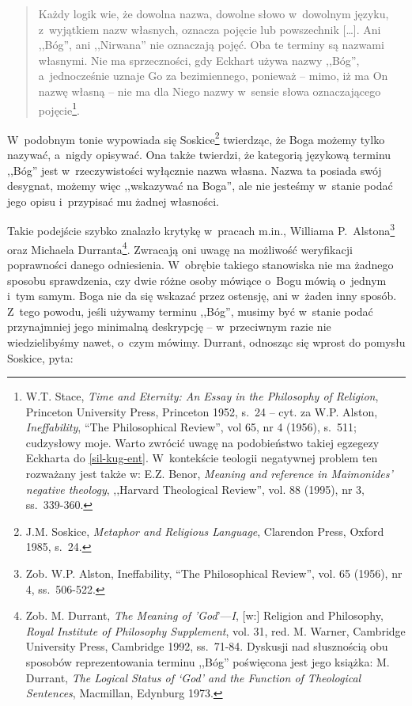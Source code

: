 \begin{quote}
Każdy logik wie, że dowolna nazwa, dowolne słowo w~dowolnym języku, z~wyjątkiem nazw własnych, oznacza pojęcie lub powszechnik [\ldots]. Ani ,,Bóg'', ani ,,Nirwana'' nie oznaczają pojęć. Oba te terminy są nazwami własnymi. Nie ma sprzeczności, gdy Eckhart używa nazwy ,,Bóg'', a~jednocześnie uznaje Go za bezimiennego, ponieważ -- mimo, iż ma On nazwę własną -- nie ma dla Niego nazwy w~sensie słowa oznaczającego pojęcie\footnote{W.T. Stace, \textit{Time and Eternity: An Essay in the Philosophy of Religion}, Princeton University Press, Princeton 1952, s.~24 -- cyt. za W.P. Alston, \textit{Ineffability}, ``The Philosophical Review'', vol 65, nr 4 (1956), s.~511; cudzysłowy moje. Warto zwrócić uwagę na podobieństwo takiej egzegezy Eckharta do \ref{sil-kug-ent}. W~kontekście teologii negatywnej problem ten rozważany jest także w: E.Z. Benor, \textit{Meaning and reference in Maimonides' negative theology}, ,,Harvard Theological Review'', vol. 88 (1995), nr 3, ss.~339-360.}.
\end{quote}

W~podobnym tonie wypowiada się Soskice\footnote{J.M. Soskice, \textit{Metaphor and Religious Language}, Clarendon Press, Oxford 1985, s.~24.} twierdząc, że Boga możemy tylko nazywać, a~nigdy opisywać. Ona także twierdzi, że kategorią językową terminu ,,Bóg'' jest w~rzeczywistości wyłącznie nazwa własna. Nazwa ta posiada swój desygnat, możemy więc ,,wskazywać na Boga'', ale nie jesteśmy w~stanie podać jego opisu i~przypisać mu żadnej własności.

Takie podejście szybko znalazło krytykę w~pracach m.in., Williama P.~Alstona\footnote{Zob. W.P. Alston, Ineffability, ``The Philosophical Review'', vol. 65 (1956), nr 4, ss.~506-522.} oraz Michaela Durranta\footnote{Zob. M. Durrant, \textit{The Meaning of 'God}'—\textit{I}, [w:] Religion and Philosophy, \textit{Royal Institute of Philosophy Supplement}, vol. 31, red. M. Warner, Cambridge University Press, Cambridge 1992, ss.~71-84. Dyskusji nad słusznością obu sposobów reprezentowania terminu ,,Bóg'' poświęcona jest jego książka: M. Durrant, \textit{The Logical Status of ‘God' and the Function of Theological Sentences}, Macmillan, Edynburg 1973.}. Zwracają oni uwagę na możliwość weryfikacji poprawności danego odniesienia. W~obrębie takiego stanowiska nie ma żadnego sposobu sprawdzenia, czy dwie różne osoby mówiące o~Bogu mówią o~jednym i~tym samym. Boga nie da się wskazać przez ostensję, ani w~żaden inny sposób. Z~tego powodu, jeśli używamy terminu ,,Bóg'', musimy być w~stanie podać przynajmniej jego minimalną deskrypcję -- w~przeciwnym razie nie wiedzielibyśmy nawet, o~czym mówimy. Durrant, odnosząc się wprost do pomysłu Soskice, pyta:


